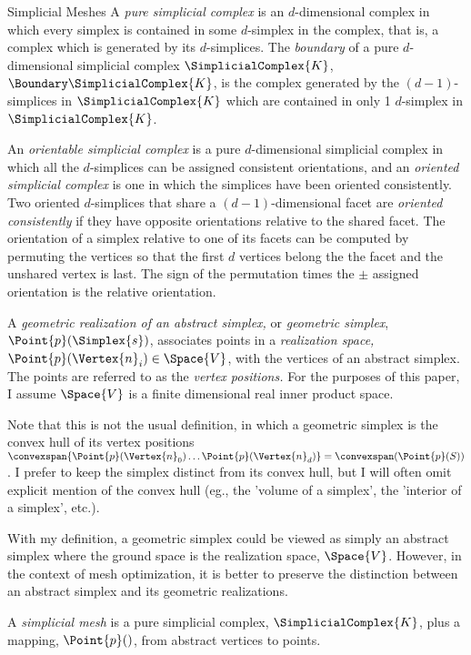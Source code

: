 \begin{plSection}{Simplicial Meshes}
A {\it pure simplicial complex} is an $d$-dimensional complex
in which every simplex is contained in some $d$-simplex in the complex,
that is, a complex which is generated by its $d$-simplices.
The {\it boundary} of a pure $d$-dimensional simplicial complex $\SimplicialComplex{K}$,
$\Boundary \SimplicialComplex{K}$,
is the complex generated by the $(d-1)$-simplices in $\SimplicialComplex{K}$
which are contained in only 1 $d$-simplex in $\SimplicialComplex{K}$.

An {\it orientable simplicial complex} is a pure $d$-dimensional simplicial complex
in which all the $d$-simplices can be assigned consistent orientations,
and an {\it oriented simplicial complex} is one in which the simplices
have been oriented consistently.
Two oriented $d$-simplices that share a $(d-1)$-dimensional facet
are {\it oriented consistently} if they have opposite orientations
relative to the shared facet. The orientation of a simplex relative to
one of its facets can be computed by permuting the vertices so that
the first $d$ vertices belong the the facet and the unshared vertex is last.
The sign of the permutation times the $\pm$ assigned orientation
is the relative orientation.




A {\it geometric realization of an abstract simplex,}
or {\it geometric simplex}, $\Point{p}(\Simplex{s})$,  associates points
in a {\it realization space,}
$\Point{p} ( \Vertex{n}_i ) \in \Space{V}$, with the vertices of an abstract simplex.
The points are referred to as the {\it vertex positions.}
For the purposes of this paper,
I assume $\Space{V}$ is
a finite dimensional real inner product space.

Note that this is not the usual definition,
in which a geometric simplex is the convex hull of its vertex positions
$\convexspan \{ \Point{p}(\Vertex{n}_0) \ldots \Point{p}(\Vertex{n}_d) \} 
= \convexspan ( \Point{p}(S) )$.
I prefer to keep the simplex distinct from its convex hull,
but I will often omit explicit mention of the convex hull
(eg., the 'volume of a simplex', the 'interior of a simplex', etc.).

With my definition,
a geometric simplex could be viewed as simply an abstract simplex
where the ground space is the realization space, $\Space{V}$.
However, in the context of mesh optimization,
it is better to preserve the distinction between an abstract simplex
and its geometric realizations.

A {\it simplicial mesh} is a pure simplicial complex, $\SimplicialComplex{K}$,
plus a mapping, $\Point{p}()$, from abstract vertices to points.


\end{plSection}

